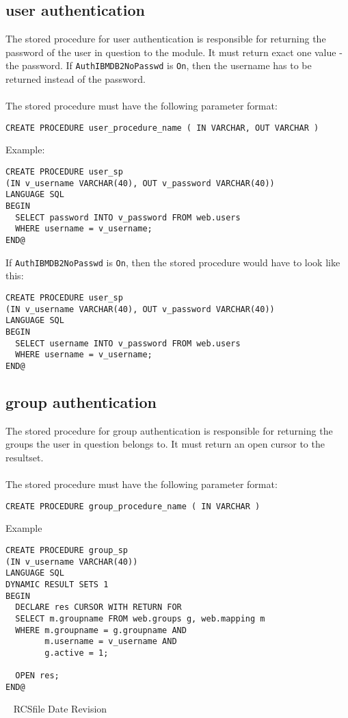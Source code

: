 \documentclass[11pt,a4paper]{article}
\begin{document}
\begin{appendix}
\subsection{user authentication} \label{usersp}
The stored procedure for user authentication is responsible for returning the password of the user in question to the module. It must return exact one value - the password. If {\tt AuthIBMDB2NoPasswd} is {\tt On}, then the username has to be returned instead of the password.\\
\\
The stored procedure must have the following parameter format:
\begin{verbatim}
CREATE PROCEDURE user_procedure_name ( IN VARCHAR, OUT VARCHAR )
\end{verbatim}
Example:
\begin{verbatim}
CREATE PROCEDURE user_sp
(IN v_username VARCHAR(40), OUT v_password VARCHAR(40))
LANGUAGE SQL
BEGIN
  SELECT password INTO v_password FROM web.users 
  WHERE username = v_username;
END@
\end{verbatim}
If {\tt AuthIBMDB2NoPasswd} is {\tt On}, then the stored procedure would have to look like this:
\begin{verbatim}
CREATE PROCEDURE user_sp
(IN v_username VARCHAR(40), OUT v_password VARCHAR(40))
LANGUAGE SQL
BEGIN
  SELECT username INTO v_password FROM web.users 
  WHERE username = v_username;
END@
\end{verbatim}
\newpage
\hypertarget{hgroupsp}{}
\subsection{group authentication} \label{groupsp}
The stored procedure for group authentication is responsible for returning the groups the user in question belongs to. It must return an open cursor to the resultset.\\
\\
The stored procedure must have the following parameter format:
\begin{verbatim}
CREATE PROCEDURE group_procedure_name ( IN VARCHAR )
\end{verbatim}
Example
\begin{verbatim}
CREATE PROCEDURE group_sp
(IN v_username VARCHAR(40))
LANGUAGE SQL
DYNAMIC RESULT SETS 1
BEGIN
  DECLARE res CURSOR WITH RETURN FOR
  SELECT m.groupname FROM web.groups g, web.mapping m 
  WHERE m.groupname = g.groupname AND
        m.username = v_username AND
        g.active = 1;

  OPEN res;
END@
\end{verbatim}

\end{appendix}

\begin{center}
\vspace{\fill}\ \newline
{\tiny \rm $ $RCSfile$ $ }
{\tiny \rm $ $Date$ $ }
{\tiny \rm $ $Revision$ $ }
\end{center}
\end{document}
